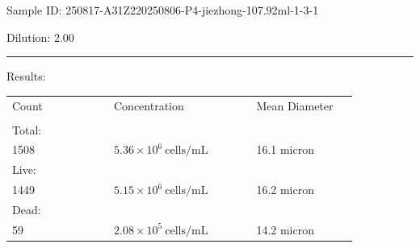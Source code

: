 \documentclass[UTF8,10pt,a4paper,fontset=fandol]{ctexart}
\newcommand{\fieldvalue}[1]{#1}
\begin{document}
\vspace{0.5em}

\textnormal{Sample ID: }\fieldvalue{250817-A31Z220250806-P4-jiezhong-107.92ml-1-3-1}

\textnormal{Dilution: }\fieldvalue{2.00}

\vspace{1em}
\hrule
\vspace{1em}

\textnormal{Results:}

\vspace{0.5em}

\small
\begin{tabular}{@{}p{0.25\linewidth}p{0.35\linewidth}p{0.25\linewidth}@{}}
\textnormal{Count} & \textnormal{Concentration} & \textnormal{Mean Diameter} \\[-0.2em]
\textnormal{\rule{0.18\linewidth}{0.4pt}} &
\textnormal{\rule{0.22\linewidth}{0.4pt}} &
\textnormal{\rule{0.18\linewidth}{0.4pt}} \\[0.3em]

\textnormal{Total:} &
\textnormal{} &
\textnormal{} \\[-0.2em]
\fieldvalue{1508} &
\fieldvalue{$5.36\times10^{6}\ \mathrm{cells/mL}$} &
\fieldvalue{16.1 micron} \\[0.3em]

\textnormal{Live:} &
\textnormal{} &
\textnormal{} \\[-0.2em]
\fieldvalue{1449} &
\fieldvalue{$5.15\times10^{6}\ \mathrm{cells/mL}$} &
\fieldvalue{16.2 micron} \\[0.3em]

\textnormal{Dead:} &
\textnormal{} &
\textnormal{} \\[-0.2em]
\fieldvalue{59} &
\fieldvalue{$2.08\times10^{5}\ \mathrm{cells/mL}$} &
\fieldvalue{14.2 micron}
\end{tabular}
\normalsize
\end{document}
